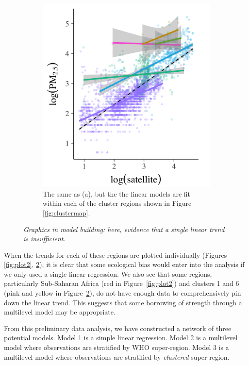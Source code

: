\documentclass{statsoc}
\begin{document}
\begin{figure}
\begin{subfigure}{0.48\textwidth}
\includegraphics[width=\textwidth]{plot3.png}
\caption{The same as (a), but the the linear models are fit within each of the
cluster regions shown in Figure \ref{fig:clustermap}.}
\label{fig:plot3}
\end{subfigure}

\caption{\it Graphics in model building: here, evidence that a single linear
trend is insufficient.}
\end{figure}

When the trends for each of these regions are plotted individually (Figures
\ref{fig:plot2}, \ref{fig:plot3}), it is clear that some ecological bias would
enter into the analysis if we only used a single linear regression.  We also see
that some regions, particularly Sub-Saharan Africa (red in Figure~\ref{fig:plot2}) 
and clusters 1 and 6 (pink and yellow in Figure~\ref{fig:plot3}), do not have enough 
data to comprehensively pin down the linear trend. This suggests that some 
borrowing of strength through a multilevel model may be appropriate.

From this preliminary data analysis, we have constructed a network of three
potential models.  Model 1 is a simple linear regression. Model 2 is a
multilevel model where observations are stratified by WHO super-region. Model 3
is a multilevel model where observations are stratified by \emph{clustered}
super-region.
\end{document}
